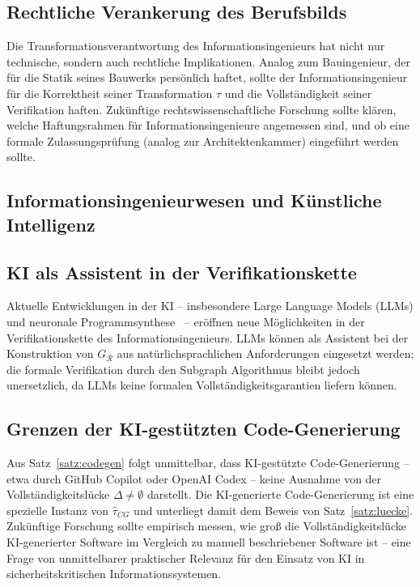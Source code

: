 ﻿\documentclass[a4paper,12pt]{report}
\theoremstyle{definition}
\begin{document}
\subsection{Rechtliche Verankerung des Berufsbilds}

Die Transformationsverantwortung des Informationsingenieurs hat nicht nur technische,
sondern auch rechtliche Implikationen. Analog zum Bauingenieur, der für die Statik
seines Bauwerks persönlich haftet, sollte der Informationsingenieur für die Korrektheit
seiner Transformation $\tau$ und die Vollständigkeit seiner Verifikation haften.
Zukünftige rechtswissenschaftliche Forschung sollte klären, welche Haftungsrahmen
für Informationsingenieure angemessen sind, und ob eine formale Zulassungsprüfung
(analog zur Architektenkammer) eingeführt werden sollte.

\subsection{Informationsingenieurwesen und Künstliche Intelligenz}

\subsection{KI als Assistent in der Verifikationskette}

Aktuelle Entwicklungen in der KI -- insbesondere Large Language Models (LLMs) und
neuronale Programmsynthese~\cite{chen2021} -- eröffnen neue Möglichkeiten in der
Verifikationskette des Informationsingenieurs. LLMs können als Assistent bei der
Konstruktion von $G_\mathcal{R}$ aus natürlichsprachlichen Anforderungen eingesetzt
werden; die formale Verifikation durch den Subgraph Algorithmus bleibt jedoch
unersetzlich, da LLMs keine formalen Vollständigkeitsgarantien liefern können.

\subsection{Grenzen der KI-gestützten Code-Generierung}

Aus Satz~\ref{satz:codegen} folgt unmittelbar, dass KI-gestützte Code-Generierung --
etwa durch GitHub Copilot oder OpenAI Codex -- keine Ausnahme von der Vollständigkeitslücke
$\Delta \neq \emptyset$ darstellt. Die KI-generierte Code-Generierung ist eine
spezielle Instanz von $\hat{\tau}_{CG}$ und unterliegt damit dem Beweis von
Satz~\ref{satz:luecke}. Zukünftige Forschung sollte empirisch messen, wie groß die
Vollständigkeitslücke KI-generierter Software im Vergleich zu manuell beschriebener
Software ist -- eine Frage von unmittelbarer praktischer Relevanz für den Einsatz von
KI in sicherheitskritischen Informationssystemen.
\end{document}
